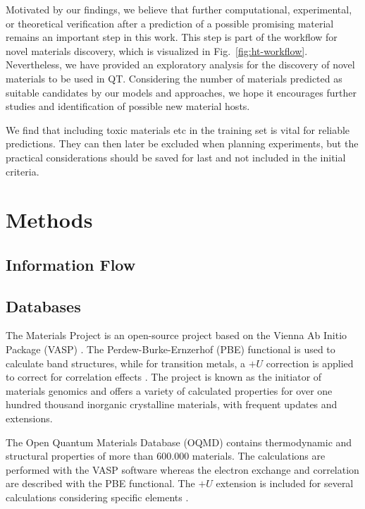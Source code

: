 \documentclass[superscriptaddress,unsortedaddress,
 amsmath,amssymb,
 aps,
]{revtex4-2}
\begin{document}

Motivated by our findings, we believe that further computational, experimental, or theoretical verification after a prediction of a possible promising material remains an important step in this work. This step is part of the workflow for novel materials discovery, which is visualized in Fig.~\ref{fig:ht-workflow}.  
Nevertheless, we have provided an exploratory analysis for the discovery of novel materials to be used in QT. Considering the number of materials predicted as suitable candidates by our models and approaches, we hope it encourages further studies and identification of possible new material hosts. 

We find that including toxic materials etc in the training set is vital for reliable predictions. They can then later be excluded when planning experiments, but the practical considerations should be saved for last and not included in the initial criteria.  

\section*{Methods}

\subsection*{Information Flow}

\subsection*{Databases} %
The Materials Project \cite{Jain2013, Jain2018} is an open-source project based on the Vienna Ab Initio Package (VASP) \cite{Kresse1996}. The Perdew-Burke-Ernzerhof \cite{Perdew1996} (PBE) functional is used to calculate band structures, while for transition metals, a $+U$ correction is applied to correct for correlation effects \cite{Wang2006}. The project is known as the initiator of materials genomics and offers a variety of calculated properties for over one hundred thousand inorganic crystalline materials, with frequent updates and extensions. 

The Open Quantum Materials Database (OQMD) \cite{Saal2013, Kirklin2015} contains thermodynamic and structural properties of more than 600.000 materials. The calculations are performed with the VASP software whereas the electron exchange and correlation are described with the PBE functional. The $+U$ extension is included for several calculations considering specific elements \cite{Stevanovic2012}. 
\end{document}
